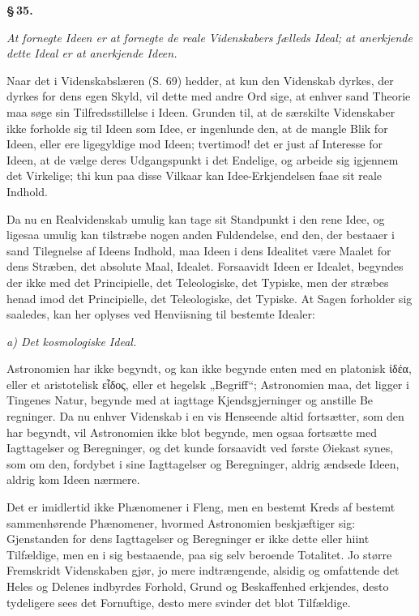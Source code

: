\documentclass[12pt]{book}
\newcommand{\opage}[1]{\marginnote{\footnotesize\textit{[#1]}}}
\begin{document}
\begin{center}{\bfseries \S\,35.}\end{center}

\emph{At fornegte Ideen er at fornegte de reale Videnskabers fælleds Ideal; at anerkjende dette
Ideal er at anerkjende Ideen.}

Naar det i Videnskabslæren (S. 69) hedder, at kun den Videnskab dyrkes, der dyrkes for dens egen
Skyld, vil dette med andre Ord sige, at enhver sand Theorie maa søge sin Tilfredsstillelse i Ideen.
Grunden til, at de særskilte Videnskaber ikke forholde sig til Ideen som Idee, er ingenlunde den, at
de mangle Blik for Ideen, eller ere ligegyldige mod Ideen; tvertimod! det er just af Interesse for
Ideen, at de vælge deres Udgangspunkt i det Endelige, og arbeide sig igjennem det Virkelige; thi kun
paa disse Vilkaar kan Idee-Erkjendelsen faae sit reale Indhold.

Da nu en Realvidenskab umulig kan tage sit Standpunkt i den rene Idee, og ligesaa umulig kan
tilstræbe nogen anden Fuldendelse, end den, der bestaaer i sand Tilegnelse af Ideens Indhold, maa
Ideen i dens Idealitet være Maalet for dens Stræben, det absolute Maal, Idealet. Forsaavidt Ideen er
Idealet, begyndes der ikke med det Principielle, det Teleologiske, det Typiske, men der stræbes henad
imod det Principielle, det Teleologiske, det Typiske. At Sagen forholder sig saaledes, kan her oplyses
ved Henviisning til bestemte Idealer:

\begin{center}\emph{a) Det kosmologiske Ideal.}\end{center}

Astronomien har ikke begyndt, og kan ikke begynde enten med en platonisk ἰδέα, eller et aristotelisk
εἶδος, eller et hegelsk „Begriff“; Astronomien maa, det ligger i Tingenes Natur, begynde med at
iagttage Kjendsgjerninger og anstille Be%
\opage{185}regninger. Da nu enhver Videnskab i en vis Henseende altid fortsætter, som den har begyndt, vil
Astronomien ikke blot begynde, men ogsaa fortsætte med Iagttagelser og Beregninger, og det kunde
forsaavidt ved første Øiekast synes, som om den, fordybet i sine Iagttagelser og Beregninger, aldrig
ændsede Ideen, aldrig kom Ideen nærmere.

Det er imidlertid ikke Phænomener i Fleng, men en bestemt Kreds af bestemt sammenhørende Phænomener,
hvormed Astronomien beskjæftiger sig: Gjenstanden for dens Iagttagelser og Beregninger er ikke dette
eller hiint Tilfældige, men en i sig bestaaende, paa sig selv beroende Totalitet. Jo større Fremskridt
Videnskaben gjør, jo mere indtrængende, alsidig og omfattende det Heles og Delenes indbyrdes Forhold,
Grund og Beskaffenhed erkjendes, desto tydeligere sees det Fornuftige, desto mere svinder det blot
Tilfældige.
\end{document}
